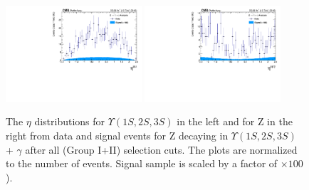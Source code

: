 \begin{figure}[!htbp]
\begin{center}
\includegraphics[width=0.45\textwidth]{figures_and_tables/outputPlots/ZtoUpsilon_Cat0_ZZZZZ/nEvts/data_x_mc/withKinCuts/h_withKin_Upsilon_eta}\hspace*{1.cm}
\includegraphics[width=0.45\textwidth]{figures_and_tables/outputPlots/ZtoUpsilon_Cat0_ZZZZZ/nEvts/data_x_mc/withKinCuts/h_withKin_Z_eta}
\end{center}\vspace*{-.5cm}
\caption{The $\eta$ distributions for $\Upsilon(1S,2S,3S)$ in the left and for Z in the right from data and signal events for Z decaying in $\Upsilon(1S,2S,3S)$ + $\gamma$ after all (Group I+II) selection cuts. The plots are normalized to the number of events. Signal sample is scaled by a factor of $\times 100$).}
\label{fig:etaUpsilon_and_Z_ZtoUpsilon_Cat0_groupI_plus_II}
\end{figure}

